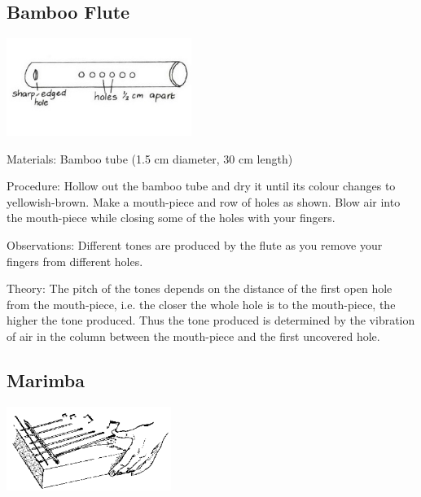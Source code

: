 \begin{multicols}{2}
\subsection{Bamboo Flute} 

\begin{center}
\includegraphics[width=0.45\textwidth]{./img/vso/bamboo-flute.jpg}
\end{center}

\begin{description*}
\item[Materials:]{Bamboo tube (1.5 cm diameter, 30 cm length)}
\item[Procedure:]{Hollow out the bamboo tube and dry it until its colour changes to yellowish-brown. Make a mouth-piece and row of holes as shown. Blow air into the mouth-piece while closing some of the holes with your fingers.}
\item[Observations:]{Different tones are produced by the flute as you remove your fingers from different holes.}
\item[Theory:]{The pitch of the tones depends on the distance of the first open hole from the mouth-piece, i.e. the closer the whole hole is to the mouth-piece, the higher the tone produced. Thus the tone produced is determined by the vibration of air in the column between the mouth-piece and the first uncovered hole.}
\end{description*}

\columnbreak

\subsection{Marimba} 

\begin{center}
\includegraphics[width=0.4\textwidth]{./img/source/marimba.png}
\end{center}


\end{multicols}
